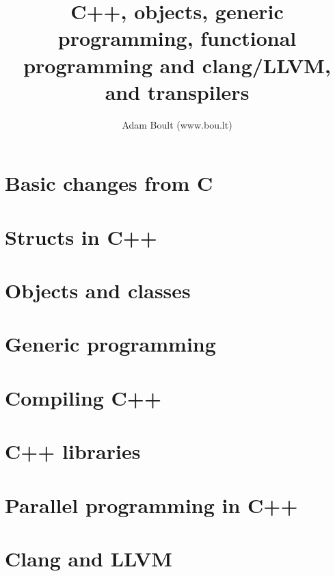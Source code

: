 \documentclass[oneside]{book}
\begin{document}
\author{Adam Boult (www.bou.lt)}
\title{C++, objects, generic programming, functional programming and clang/LLVM, and transpilers}
\maketitle

\setcounter{tocdepth}{0}
\tableofcontents



\part{Basic changes from C}








\part{Structs in C++}




\part{Objects and classes}



\part{Generic programming}




\part{Compiling C++}



\part{C++ libraries}




\part{Parallel programming in C++}

\part{Clang and LLVM}

\end{document}
